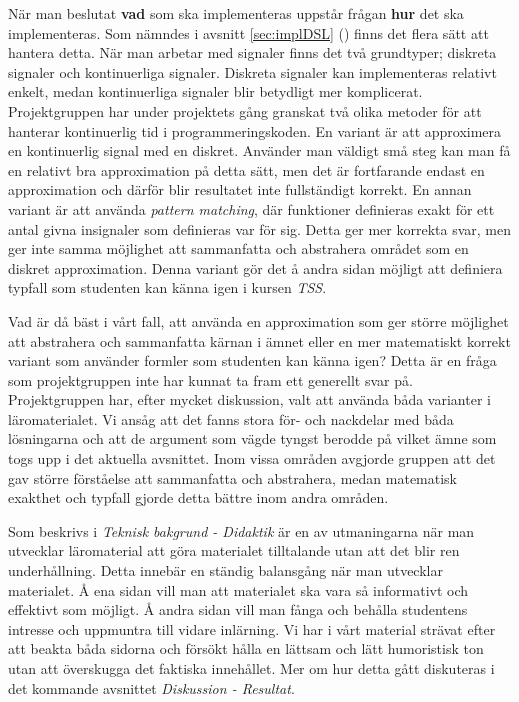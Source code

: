 \documentclass[]{article}
\begin{document}
När man beslutat \textbf{vad} som ska implementeras uppstår frågan \textbf{hur} det ska implementeras. Som nämndes i
avsnitt \ref{sec:implDSL} ()
finns det flera sätt att hantera detta. När man
arbetar med signaler finns det två grundtyper; diskreta signaler och kontinuerliga signaler. Diskreta signaler kan
implementeras relativt enkelt, medan kontinuerliga signaler blir betydligt mer komplicerat. Projektgruppen har under
projektets gång granskat två olika metoder för att hanterar kontinuerlig tid i programmeringskoden. En variant är att
approximera en kontinuerlig signal med en diskret. Använder man väldigt små steg kan man få en relativt bra
approximation på detta sätt, men det är fortfarande endast en approximation och därför blir resultatet inte
fullständigt korrekt.
En annan variant är att använda \textit{pattern matching}, där funktioner definieras exakt för
ett antal givna insignaler som definieras var för sig. Detta ger mer korrekta svar, men ger inte samma möjlighet att
sammanfatta och abstrahera området som en diskret approximation. Denna variant gör det å andra sidan möjligt att
definiera typfall som studenten kan känna igen i kursen \textit{TSS}.

Vad är då bäst i vårt fall, att använda en approximation som ger större möjlighet att abstrahera och sammanfatta kärnan
i ämnet eller en mer matematiskt korrekt variant som använder formler som studenten kan känna igen? Detta är en fråga
som projektgruppen inte har kunnat ta fram ett generellt svar på. Projektgruppen har, efter mycket diskussion, valt att
använda båda varianter i läromaterialet. Vi ansåg att det fanns stora för- och nackdelar med båda lösningarna och att
de argument som vägde tyngst berodde på vilket ämne som togs upp i det aktuella avsnittet. Inom vissa områden avgjorde
gruppen att det gav större förståelse att sammanfatta och abstrahera, medan matematisk exakthet och typfall gjorde
detta bättre inom andra områden.

Som beskrivs i \textit{Teknisk bakgrund - Didaktik} är en av utmaningarna när man utvecklar läromaterial att göra
materialet tilltalande utan att det blir ren underhållning. Detta innebär en ständig balansgång när man utvecklar
materialet. Å ena sidan vill man att materialet ska vara så informativt och effektivt som möjligt. Å andra sidan vill
man fånga och behålla studentens intresse och uppmuntra till vidare inlärning. Vi har i vårt material strävat efter att
beakta båda sidorna och försökt hålla en lättsam och lätt humoristisk ton utan att överskugga det faktiska innehållet.
Mer om hur detta gått diskuteras i det kommande avsnittet \textit{Diskussion - Resultat}.
\end{document}
